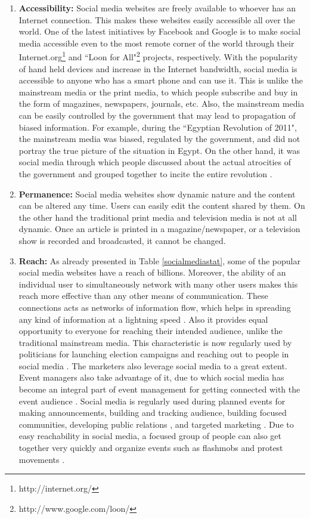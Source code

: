 \begin{enumerate}
\item \textbf{Accessibility:} Social media websites are freely available to whoever has an Internet connection. This makes these websites easily accessible all over the world. One of the latest initiatives by Facebook and Google is to make social media accessible even to the most remote corner of the world through their Internet.org\footnote{http://internet.org/} and ``Loon for All"\footnote{http://www.google.com/loon/} projects, respectively. With the popularity of hand held devices and increase in the Internet bandwidth, social media is accessible to anyone who has a smart phone and can use it. This is unlike the mainstream media or the print media, to which people subscribe and buy in the form of magazines, newspapers, journals, etc. Also, the mainstream media can be easily controlled by the government that may lead to propagation of biased information. For example, during the ``Egyptian Revolution of 2011", the mainstream media was biased, regulated by the government, and did not portray the true picture of the situation in Egypt. On the other hand, it was social media through which people discussed about the actual atrocities of the government and grouped together to incite the entire revolution \cite{hamdy2012framing}.

\item \textbf{Permanence:} Social media websites show dynamic nature and the content can be altered any time.  Users can easily edit the content shared by them. On the other hand the traditional print media and television media is not at all dynamic. Once an article is printed in a magazine/newspaper, or a television show is recorded and broadcasted, it cannot be changed.

\item \textbf{Reach:} As already presented in Table \ref{socialmediastat}, some of the popular social media websites have a reach of billions. Moreover, the ability of an individual user to simultaneously network with many other users makes this reach more effective than any other means of communication. These connections acts as networks of information flow, which helps in spreading any kind of information at a lightning speed \cite{bakshy2012role}. Also it provides equal opportunity to everyone for reaching their intended audience, unlike the traditional mainstream media. This characteristic is now regularly used by politicians for launching election campaigns and reaching out to people in social media \cite{metzgar2009social}. The marketers also leverage social media to a great extent. Event managers also take advantage of it, due to which social media has become an integral part of event management for getting connected with the event audience \cite{socialmediaforevents}. Social media is regularly used during planned events for making announcements, building and tracking audience, building focused communities, developing public relations \cite{eyrich2008pr}, and targeted marketing \cite{mangold2009social}. Due to easy reachability in social media, a focused group of people can also get together very quickly and organize events such as flashmobs and protest movements \cite{sen2012identifying}. 


\end{enumerate}
